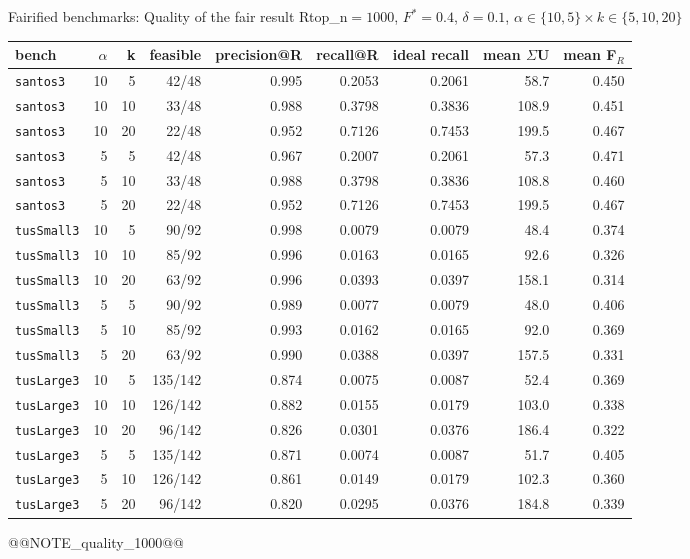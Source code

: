 \begin{frame}{Fairified benchmarks: Quality of the fair result R}{top\_n$=1000$, $F^*{=}0.4$, $\delta{=}0.1$, $\alpha\in\{10,5\}\times k\in\{5,10,20\}$}
\tiny
\begin{center}
\setlength{\tabcolsep}{2.5pt}
\begin{tabular}{lrrrrrrrr}
\toprule
bench & $\alpha$ & k & feasible & precision@R & recall@R & ideal recall & mean $\Sigma$U & mean F$_R$ \\
\midrule
\texttt{santos3} & 10 & 5 & 42/48 & 0.995 & 0.2053 & 0.2061 & 58.7 & 0.450 \\
\texttt{santos3} & 10 & 10 & 33/48 & 0.988 & 0.3798 & 0.3836 & 108.9 & 0.451 \\
\texttt{santos3} & 10 & 20 & 22/48 & 0.952 & 0.7126 & 0.7453 & 199.5 & 0.467 \\
\texttt{santos3} & 5 & 5 & 42/48 & 0.967 & 0.2007 & 0.2061 & 57.3 & 0.471 \\
\texttt{santos3} & 5 & 10 & 33/48 & 0.988 & 0.3798 & 0.3836 & 108.8 & 0.460 \\
\texttt{santos3} & 5 & 20 & 22/48 & 0.952 & 0.7126 & 0.7453 & 199.5 & 0.467 \\
\texttt{tusSmall3} & 10 & 5 & 90/92 & 0.998 & 0.0079 & 0.0079 & 48.4 & 0.374 \\
\texttt{tusSmall3} & 10 & 10 & 85/92 & 0.996 & 0.0163 & 0.0165 & 92.6 & 0.326 \\
\texttt{tusSmall3} & 10 & 20 & 63/92 & 0.996 & 0.0393 & 0.0397 & 158.1 & 0.314 \\
\texttt{tusSmall3} & 5 & 5 & 90/92 & 0.989 & 0.0077 & 0.0079 & 48.0 & 0.406 \\
\texttt{tusSmall3} & 5 & 10 & 85/92 & 0.993 & 0.0162 & 0.0165 & 92.0 & 0.369 \\
\texttt{tusSmall3} & 5 & 20 & 63/92 & 0.990 & 0.0388 & 0.0397 & 157.5 & 0.331 \\
\texttt{tusLarge3} & 10 & 5 & 135/142 & 0.874 & 0.0075 & 0.0087 & 52.4 & 0.369 \\
\texttt{tusLarge3} & 10 & 10 & 126/142 & 0.882 & 0.0155 & 0.0179 & 103.0 & 0.338 \\
\texttt{tusLarge3} & 10 & 20 & 96/142 & 0.826 & 0.0301 & 0.0376 & 186.4 & 0.322 \\
\texttt{tusLarge3} & 5 & 5 & 135/142 & 0.871 & 0.0074 & 0.0087 & 51.7 & 0.405 \\
\texttt{tusLarge3} & 5 & 10 & 126/142 & 0.861 & 0.0149 & 0.0179 & 102.3 & 0.360 \\
\texttt{tusLarge3} & 5 & 20 & 96/142 & 0.820 & 0.0295 & 0.0376 & 184.8 & 0.339 \\
\bottomrule
\end{tabular}
\end{center}
@@NOTE_quality_1000@@
\end{frame}


